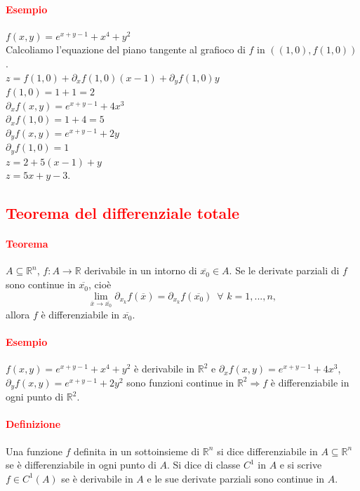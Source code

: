 \documentclass{article}
\newcommand{\R}{\mathbb{R}}
\begin{document}
\paragraph{\textcolor{red}{Esempio}}
$f(x,y)=e^{x+y-1}+x^4+y^2$\\
Calcoliamo l'equazione del piano tangente al grafioco di $f$ in $((1,0),f(1,0))$.\\
$z=f(1,0)+\partial_xf(1,0)(x-1)+\partial_yf(1,0)y$\\
$f(1,0)=1+1=2$\\
$\partial_xf(x,y)=e^{x+y-1}+4x^3$\\
$\partial_x f(1,0)=1+4=5$\\
$\partial_yf(x,y)=e^{x+y-1}+2y$\\
$\partial_yf(1,0)=1$\\
$z=2+5(x-1)+y$\\
$z=5x+y-3$.

\subsection{\textcolor{red}{Teorema del differenziale totale}}
\paragraph{\textcolor{red}{Teorema}}
$A \subseteq \R^n$, $f:A\rightarrow \R$ derivabile in un intorno di $\overline{x_0}\in A$. Se le derivate parziali di $f$ sono continue in $\overline{x_0}$, cioè
\begin{equation*}
    \lim_{\overline{x}\rightarrow\overline{x_0}}\partial_{x_k}f(\overline{x})=\partial_{x_k}f(\overline{x_0})\,\,\, \forall \,\,k=1,...,n,
\end{equation*}
allora $f$ è differenziabile in $\overline{x_0}$.

\paragraph{\textcolor{red}{Esempio}}
$f(x,y)=e^{x+y-1}+x^4+y^2$ è derivabile in $\R^2$ e $\partial_x f(x,y)=e^{x+y-1}+4x^3$, $\partial_y f(x,y)=e^{x+y-1}+2y^2$ sono funzioni continue in $\R^2 \Rightarrow f$ è differenziabile in ogni punto di $\R^2$.

\paragraph{\textcolor{red}{Definizione}}
Una funzione $f$ definita in un sottoinsieme di $\R^n$ si dice differenziabile in $A \subseteq\R^n$ se è differenziabile in ogni punto di $A$. Si dice di classe $C^1$ in $A$ e si scrive $f \in C^1(A)$ se è derivabile in $A$ e le sue derivate parziali sono continue in $A$.
\end{document}
